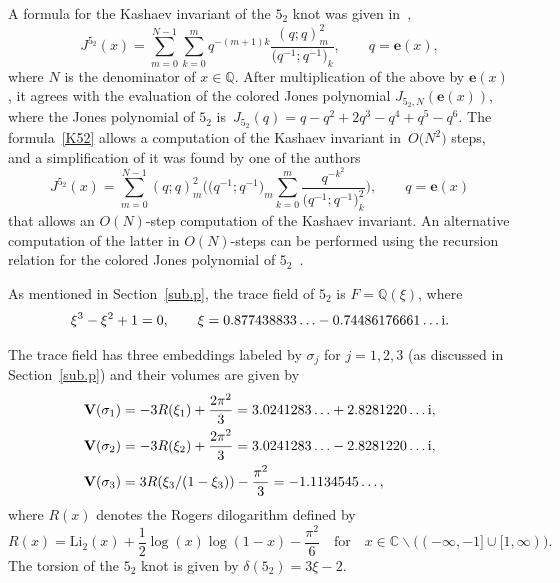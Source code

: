 \documentclass[pdftex]{sigma}
\numberwithin{equation}{section}
\def\BQ{\mathbb Q}
\def\e{\mathbf{e}}
\def\C{\mathbb C}
\def\e{\mathbf{e}}
\def\s{\sigma}
\def\J{\mathbf J} \def\J{J} %
\def\V{\mathbf V}
\def\be{\begin{equation}}
\def\ee{\end{equation}}
\def\ssm{\smallsetminus}
\begin{document}
A formula for the Kashaev invariant of the $5_2$ knot
was given in~\cite[equation~(2.3)]{K97},
\be
\label{K52}
\J^{5_2}(x)=\sum_{m=0}^{N-1} \sum_{k=0}^m
q^{-(m+1)k} \frac{(q;q)_m^2}{\big(q^{-1};q^{-1}\big)_k}, \qquad q=\e(x),
\ee
where $N$ is the denominator of $x \in \BQ$. After multiplication of
the above by $\e(x)$, it agrees with the evaluation of the colored
Jones polynomial $J_{5_2,N}(\e(x))$, where the Jones polynomial of $5_2$
is~${J_{5_2}(q)=q - q^2 + 2 q^3 - q^4 + q^5 - q^6}$.
The formula~\eqref{K52} allows a computation of the Kashaev invariant
in~$O\big(N^2\big)$ steps, and a simplification of it was found by one of the
authors~\cite[Section~4.1]{DGLZ}
\[
\J^{5_2}(x)=\sum_{m=0}^{N-1} (q;q)_m^2 %
\Biggl(
\big(q^{-1};q^{-1}\big)_m \sum_{k=0}^m \frac{q^{-k^2}}{\big(q^{-1};q^{-1}\big)_k^2} \Biggr),
\qquad q=\e(x)
\]
that allows an $O(N)$-step computation of the Kashaev invariant.
An alternative computation of the latter in $O(N)$-steps can be performed
using the recursion relation for the colored Jones polynomial of
$5_2$~\cite{GS}.

As mentioned in Section~\ref{sub.p}, the trace field of $5_2$ is $F=\BQ(\xi)$, where
\be
\label{a52}
\xi^3-\xi^2+1=0, \qquad \xi = 0.877438833\ldots -
0.74486176661\ldots {\rm i} .
\ee

The trace field has three embeddings labeled by $\s_j$ for $j=1,2,3$
(as discussed in Section~\ref{sub.p}) and their volumes are given
by
\begin{align*}
 \V(\s_1) &= -3 R(\xi_1)+\frac{2 \pi^2}{3}
 = 3.0241283 \ldots + 2.8281220 \ldots  {\rm i},
 \\
 \V(\s_2) &= -3 R(\xi_2)+\frac{2 \pi^2}{3}
 = 3.0241283 \ldots -2.8281220 \ldots  {\rm i},
 \\
 \V(\s_3) &= 3 R(\xi_3/(1-\xi_3))-\frac{\pi^2}{3} = -1.1134545 \ldots,
\end{align*}
where $R(x)$ denotes the Rogers dilogarithm defined by
\[%
R(x) = \text{Li}_2(x) + \frac12 \log(x) \log(1-x) - \frac{\pi^2}6
\quad \text{for} \quad
x\in\C\ssm\bigl( (-\infty,-1] \cup [1,\infty) \bigr) .
\]
The torsion of the $5_2$ knot is given by $\delta(5_2)=3\xi-2$.
\end{document}
